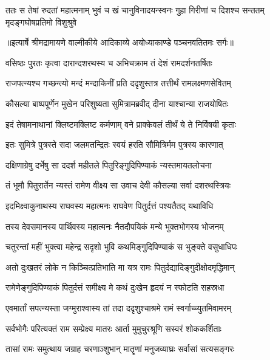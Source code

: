 \fourlineindentedshloka
{ततः स तेषां रुदतां महात्मनाम्}
{भुवं च खं चानुविनादयन्स्वनः}
{गुहा गिरीणां च दिशश्च सन्ततम्}
{मृदङ्गघोषप्रतिमो विशुश्रुवे} %


{॥इत्यार्षे श्रीमद्रामायणे वाल्मीकीये आदिकाव्ये अयोध्याकाण्डे पञ्चनवतितमः सर्गः॥}


\twolineshloka
{वसिष्ठः पुरतः कृत्वा दारान्दशरथस्य च}
{अभिचक्राम तं देशं रामदर्शनतर्षितः} %

\twolineshloka
{राजपत्न्यश्च गच्छन्त्यो मन्दं मन्दाकिनीं प्रति}
{ददृशुस्तत्र तत्तीर्थं रामलक्ष्मणसेवितम्} %

\twolineshloka
{कौसल्या बाष्पपूर्णेन मुखेन परिशुष्यता}
{सुमित्रामब्रवीद् दीना याश्चान्या राजयोषितः} %

\twolineshloka
{इदं तेषामनाथानां क्लिष्टमक्लिष्ट कर्मणाम्}
{वने प्राक्केवलं तीर्थं ये ते निर्विषयी कृताः} %

\twolineshloka
{इतः सुमित्रे पुत्रस्ते सदा जलमतन्द्रितः}
{स्वयं हरति सौमित्रिर्मम पुत्रस्य कारणात्} %

\twolineshloka
{दक्षिणाग्रेषु दर्भेषु सा ददर्श महीतले}
{पितुरिङ्गुदिपिण्याकं न्यस्तमायतलोचना} %

\twolineshloka
{तं भूमौ पितुरार्तेन न्यस्तं रामेण वीक्ष्य सा}
{उवाच देवी कौसल्या सर्वा दशरथस्त्रियः} %

\twolineshloka
{इदमिक्ष्वाकुनाथस्य राघवस्य महात्मनः}
{राघवेण पितुर्दत्तं पश्यतैतद् यथाविधि} %

\twolineshloka
{तस्य देवसमानस्य पार्थिवस्य महात्मनः}
{नैतदौपयिकं मन्ये भुक्तभोगस्य भोजनम्} %

\twolineshloka
{चतुरन्तां महीं भुक्त्वा महेन्द्र सदृशो भुवि}
{कथमिङ्गुदिपिण्याकं स भुङ्क्ते वसुधाधिपः} %

\twolineshloka
{अतो दुःखतरं लोके न किञ्चित्प्रतिभाति मा}
{यत्र रामः पितुर्दद्यादिङ्गुदीक्षोदमृद्धिमान्} %

\twolineshloka
{रामेणेङ्गुदिपिण्याकं पितुर्दत्तं समीक्ष्य मे}
{कथं दुःखेन हृदयं न स्फोटति सहस्रधा} %

\twolineshloka
{एवमार्तां सपत्न्यस्ता जग्मुराश्वास्य तां तदा}
{ददृशुश्चाश्रमे रामं स्वर्गाच्च्युतमिवामरम्} %

\twolineshloka
{सर्वभोगैः परित्यक्तं राम सम्प्रेक्ष्य मातरः}
{आर्ता मुमुचुरश्रूणि सस्वरं शोककर्शिताः} %

\twolineshloka
{तासां रामः समुत्थाय जग्राह चरणाञ्शुभान्}
{मातॄणां मनुजव्याघ्रः सर्वासां सत्यसङ्गरः} %

